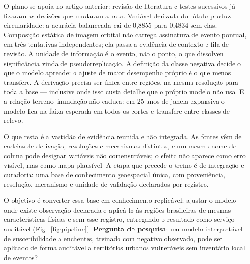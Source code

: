 \documentclass[conference]{IEEEtran}
\begin{document}
O plano se apoia no artigo anterior: revisão de literatura e testes
sucessivos já fixaram as decisões que mudaram a rota. Variável derivada
do rótulo produz circularidade: a acurácia balanceada cai de 0,8855 para 0,4834
sem elas. Composição estática de imagem orbital não carrega assinatura de evento
pontual, em três tentativas independentes; ela passa a evidência de contexto e
fila de revisão. A unidade de informação é o evento, não o ponto, o
que dissolveu significância vinda de pseudorreplicação. A definição da
classe negativa decide o que o modelo aprende: o ajuste de maior desempenho
próprio é o que menos transfere. A derivação precisa ser única entre regiões, na mesma
resolução para toda a base --- inclusive onde isso custa detalhe que o
próprio modelo não usa. E a relação terreno--inundação não caduca: em 25
anos de janela expansiva o modelo fica na faixa esperada em todos os cortes e
transfere entre classes de relevo.

O que resta é a vastidão de evidência reunida e não integrada. As fontes
vêm de cadeias de derivação, resoluções e mecanismos distintos,
e um mesmo nome de coluna pode designar variáveis não comensuráveis; o efeito não aparece como erro visível, mas como mapa plausível. A etapa
que precede o treino é de integração e curadoria: uma base de conhecimento
geoespacial única, com proveniência, resolução, mecanismo e unidade
de validação declarados por registro.

O objetivo é converter essa base em conhecimento replicável: ajustar o modelo
onde existe observação declarada e aplicá-lo às regiões brasileiras de mesmas
características físicas e sem esse registro, entregando o resultado como serviço
auditável (Fig.~\ref{fig:pipeline}).
\textbf{Pergunta de pesquisa}: um modelo interpretável de suscetibilidade a
enchentes, treinado com negativo observado, pode ser aplicado de forma auditável
a territórios urbanos vulneráveis sem inventário local de eventos?
\end{document}
